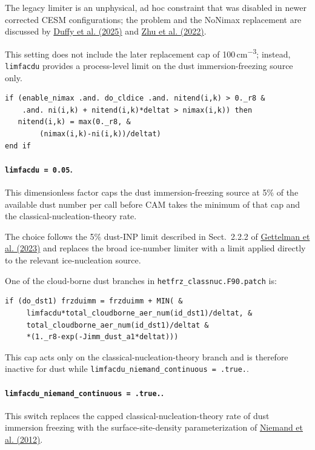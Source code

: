 The legacy limiter is an unphysical, ad hoc constraint that was disabled in newer corrected CESM configurations; the problem and the NoNimax replacement are discussed by \href{https://doi.org/10.1029/2025MS004967}{Duffy et al. (2025)} and \href{https://doi.org/10.1029/2021MS002776}{Zhu et al. (2022)}.

This setting does not include the later replacement cap of 100\,cm\textsuperscript{$-3$}; instead, \texttt{limfacdu} provides a process-level limit on the dust immersion-freezing source only.

\begin{verbatim}
if (enable_nimax .and. do_cldice .and. nitend(i,k) > 0._r8 &
    .and. ni(i,k) + nitend(i,k)*deltat > nimax(i,k)) then
   nitend(i,k) = max(0._r8, &
        (nimax(i,k)-ni(i,k))/deltat)
end if
\end{verbatim}

\paragraph*{\texttt{limfacdu = 0.05}.}
This dimensionless factor caps the dust immersion-freezing source at 5\% of the available dust number per call before CAM takes the minimum of that cap and the classical-nucleation-theory rate.

The choice follows the 5\% dust-INP limit described in Sect.~2.2.2 of \href{https://doi.org/10.5194/gmd-16-1735-2023}{Gettelman et al. (2023)} and replaces the broad ice-number limiter with a limit applied directly to the relevant ice-nucleation source.

One of the cloud-borne dust branches in \texttt{hetfrz\_classnuc.F90.patch} is:

\begin{verbatim}
if (do_dst1) frzduimm = frzduimm + MIN( &
     limfacdu*total_cloudborne_aer_num(id_dst1)/deltat, &
     total_cloudborne_aer_num(id_dst1)/deltat &
     *(1._r8-exp(-Jimm_dust_a1*deltat)))
\end{verbatim}

This cap acts only on the classical-nucleation-theory branch and is therefore inactive for dust while \texttt{limfacdu\_niemand\_continuous = .true.}.

\paragraph*{\texttt{limfacdu\_niemand\_continuous = .true.}.}
This switch replaces the capped classical-nucleation-theory rate of dust immersion freezing with the surface-site-density parameterization of \href{https://doi.org/10.1175/JAS-D-11-0249.1}{Niemand et al. (2012)}.

